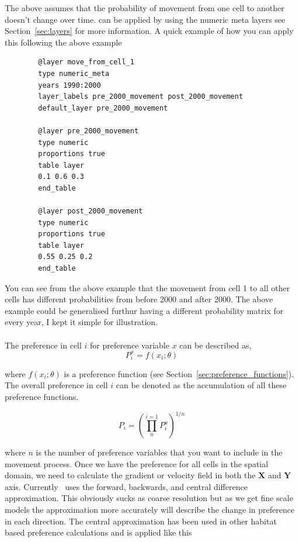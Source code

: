 The above assumes that the probability of movement from one cell to another doesn't change over time.  can be applied by using the numeric meta layers see Section~\ref{sec:layers} for more information. A quick example of how you can apply this following the above example

{\small{\begin{verbatim}
		@layer move_from_cell_1
		type numeric_meta
		years 1990:2000
		layer_labels pre_2000_movement post_2000_movement
		default_layer pre_2000_movement
		
		@layer pre_2000_movement
		type numeric
		proportions true
		table layer
		0.1 0.6 0.3
		end_table
		
		@layer post_2000_movement
		type numeric
		proportions true
		table layer
		0.55 0.25 0.2
		end_table
		\end{verbatim}}}


You can see from the above example that the movement from cell 1 to all other cells has different probabilities from before 2000 and after 2000. The above example could be generalised furthur having a different probability matrix for every year, I kept it simple for illustration.






\paragraph{}\label{subsubsec:pref_movement}

The preference in cell $i$ for preference variable $x$ can be described as,
\begin{equation}
P_i^x = f(x_i; \theta)
\end{equation}

where $f(x_i; \theta)$ is a preference function (see Section~\ref{sec:preference_functions}). The overall preference in cell $i$ can be denoted as the accumulation of all these preference functions.

\begin{equation}
   P_i = \left(\prod_{n}^{i = 1}P_i^x\right)^{1/n}
\end{equation}

where $n$ is the number of preference variables that you want to include in the movement process. Once we have the preference for all cells in the spatial domain, we need to calculate the gradient or velocity field in both the $\textbf{X}$ and $\textbf{Y}$ axis. Currently \IBM\ uses the forward, backwards, and central difference approximation. This obviously sucks as coarse resolution but as we get fine scale models the approximation more accurately will describe the change in preference in each direction. The central approximation has been used in other habitat based preference calculations \citep{phillips2018individual} and is applied like this

